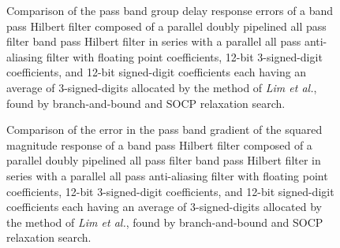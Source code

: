 \documentclass[a4paper,twoside,10pt,english]{article}
\newcommand{\DesignOfSchurLatticeFiltersPdfScale}{1}
\begin{document}
\begin{figure}
\centering
\scalebox{\DesignOfSchurLatticeFiltersPdfScale}{}
\caption{Comparison of the pass band group delay response errors of a band pass
  Hilbert filter composed of a parallel doubly pipelined all pass filter band
  pass Hilbert filter in series with a parallel all pass anti-aliasing
  filter with floating point coefficients, 12-bit 3-signed-digit coefficients,
  and 12-bit signed-digit coefficients each having an average of 3-signed-digits
  allocated by the method of \emph{Lim et al.}, found by branch-and-bound and
  SOCP relaxation search.}
\label{fig:Comp-schurOneMPAlattice-doubly-pipelined-bandpass-hilbert-12-nbits-delay}
\end{figure}

\begin{figure}
\centering
\scalebox{\DesignOfSchurLatticeFiltersPdfScale}{}
\caption{Comparison of the error in the pass band gradient of the squared
  magnitude response of a band pass Hilbert filter composed of a parallel
  doubly pipelined all pass filter band pass Hilbert filter in series with a
  parallel all pass anti-aliasing filter with floating point coefficients,
  12-bit 3-signed-digit coefficients, and 12-bit signed-digit coefficients
  each having an average of 3-signed-digits allocated by the method of
  \emph{Lim et al.}, found by branch-and-bound and SOCP relaxation search.}
\label{fig:Comp-schurOneMPAlattice-doubly-pipelined-bandpass-hilbert-12-nbits-dAsqdw}
\end{figure}
\end{document}
